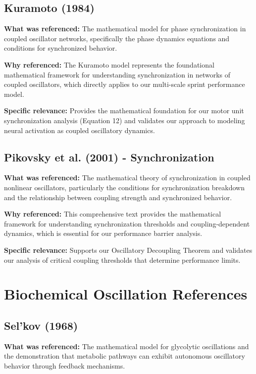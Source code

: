 \documentclass{article}
\begin{document}
\subsection{Kuramoto (1984)}

\textbf{What was referenced:} The mathematical model for phase synchronization in coupled oscillator networks, specifically the phase dynamics equations and conditions for synchronized behavior.

\textbf{Why referenced:} The Kuramoto model represents the foundational mathematical framework for understanding synchronization in networks of coupled oscillators, which directly applies to our multi-scale sprint performance model.

\textbf{Specific relevance:} Provides the mathematical foundation for our motor unit synchronization analysis (Equation 12) and validates our approach to modeling neural activation as coupled oscillatory dynamics.

\subsection{Pikovsky et al. (2001) - Synchronization}

\textbf{What was referenced:} The mathematical theory of synchronization in coupled nonlinear oscillators, particularly the conditions for synchronization breakdown and the relationship between coupling strength and synchronized behavior.

\textbf{Why referenced:} This comprehensive text provides the mathematical framework for understanding synchronization thresholds and coupling-dependent dynamics, which is essential for our performance barrier analysis.

\textbf{Specific relevance:} Supports our Oscillatory Decoupling Theorem and validates our analysis of critical coupling thresholds that determine performance limits.

\section{Biochemical Oscillation References}

\subsection{Sel'kov (1968)}

\textbf{What was referenced:} The mathematical model for glycolytic oscillations and the demonstration that metabolic pathways can exhibit autonomous oscillatory behavior through feedback mechanisms.
\end{document}

